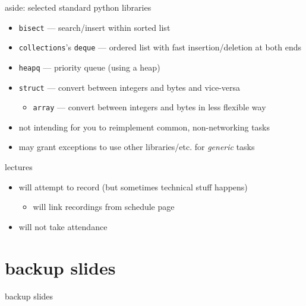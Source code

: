 \begin{frame}{aside: selected standard python libraries}
    \begin{itemize}
    \item \texttt{bisect} --- search/insert within sorted list
    \item \texttt{collections}'s \texttt{deque} --- ordered list with fast insertion/deletion at both ends
    \item \texttt{heapq} --- priority queue (using a heap)
    \item \texttt{struct} --- convert between integers and bytes and vice-versa
        \begin{itemize}
        \item \texttt{array} --- convert between integers and bytes in less flexible way
        \end{itemize}
    \vspace{.5cm}
    \item not intending for you to reimplement common, non-networking tasks
    \item may grant exceptions to use other libraries/etc. for \textit{generic} tasks
    \end{itemize}
\end{frame}

\begin{frame}{lectures}
    \begin{itemize}
    \item will attempt to record (but sometimes technical stuff happens)
        \begin{itemize}
        \item will link recordings from schedule page
        \end{itemize}
    \item will not take attendance
    \end{itemize}
\end{frame}

\section{backup slides}
\begin{frame}{backup slides}
\end{frame}


